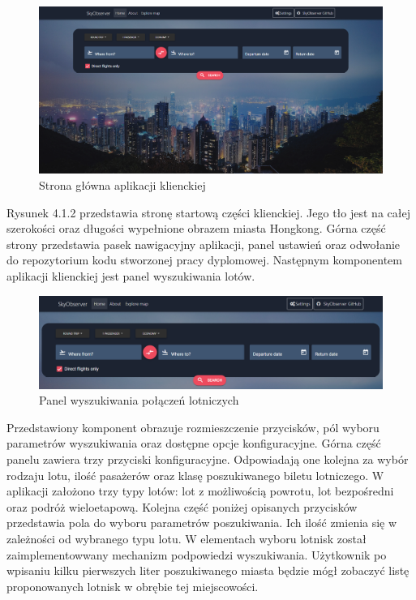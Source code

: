 \documentclass[12pt, twoside]{report}
\begin{document}
\begin{figure}[!ht]
\centering
\includegraphics[scale=0.32, keepaspectratio]{client_main_page.png}
\caption{Strona główna aplikacji klienckiej}
\label{fig:client_main_page}
\end{figure}
Rysunek 4.1.2 przedstawia stronę startową części klienckiej. Jego tło jest na całej szerokości oraz długości wypełnione obrazem miasta Hongkong. Górna część strony przedstawia pasek nawigacyjny aplikacji, panel ustawień oraz odwołanie do repozytorium kodu stworzonej pracy dyplomowej. Następnym komponentem aplikacji klienckiej jest panel wyszukiwania lotów.

\begin{figure}[!ht]
\centering
\includegraphics[scale=0.39, keepaspectratio]{search_panel.png}
\caption{Panel wyszukiwania połączeń lotniczych}
\label{fig:search_panel}
\end{figure}

Przedstawiony komponent obrazuje rozmieszczenie przycisków, pól wyboru parametrów wyszukiwania oraz dostępne opcje konfiguracyjne. Górna część panelu zawiera trzy przyciski konfiguracyjne. Odpowiadają one kolejna za wybór rodzaju lotu, ilość pasażerów oraz klasę poszukiwanego biletu lotniczego. W aplikacji założono trzy typy lotów: lot z możliwością powrotu, lot bezpośredni oraz podróż wieloetapową. Kolejna część poniżej opisanych przycisków przedstawia pola do wyboru parametrów poszukiwania. Ich ilość zmienia się w zależności od wybranego typu lotu.
\newpage
W elementach wyboru lotnisk został zaimplementowwany mechanizm podpowiedzi wyszukiwania. Użytkownik po wpisaniu kilku pierwszych liter poszukiwanego miasta będzie mógł zobaczyć listę proponowanych lotnisk w obrębie tej miejscowości. 
\end{document}

